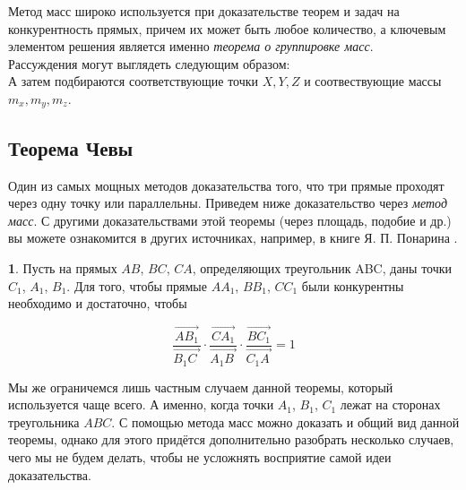 \documentclass[14pt]{extarticle}
\let\Overrightarrow\overrightarrow
\theoremstyle{definition}
\newcommand{\theoremmark} {
\tikz [baseline = (N.base), roundnode/.style={inner sep = 3pt, circle, draw=black!90, 
fill=white, very thick, minimum size=5mm},] {
\node [roundnode] (N){Т}    
    }
}
\theoremstyle{theorem}
\newenvironment{namedtheorem}[2]
{
\newcommand{\foo}{#1}
\newtheorem*{\foo{}}{\normalfont\fontsize{15}{15}{\theoremmark Теорема #2}}
\begin{\foo{}}
}
{\end{\foo{}}}
\begin{document}
Метод масс широко используется при доказательстве теорем и задач на
конкурентность прямых, причем их может быть любое количество, а ключевым 
элементом решения является именно \textit{теорема о группировке масс}.\\
Рассуждения могут выглядеть следующим образом:
\textit{}\\
А затем подбираются соответствующие точки \(X, Y, Z\) и соотвествующие 
массы \(m_x, m_y, m_z\).

\subsection{Теорема Чевы} 

\indent Один из самых мощных методов доказательства того, что три прямые 
проходят через одну точку или параллельны. 
Приведем ниже доказательство через \textit{метод масс}.
С другими доказательствами этой теоремы (через площадь, подобие и др.) 
вы можете ознакомится в других источниках, например, в книге Я. П. Понарина
.\\

\begin{namedtheorem}{ceva}{Чевы}
	Пусть на прямых $AB$, $BC$, $CA$, определяющих
    треугольник ABC, даны точки $C_1$, $A_1$, $B_1$. Для того, чтобы прямые
    $AA_1$, $BB_1$, $CC_1$ были конкурентны
    необходимо и достаточно, чтобы
	
	\begin{ceqn}
	\[
    \dfrac{\Overrightarrow{AB_1}}{\Overrightarrow{B_1C_{\, \,}}} \cdot 
	\dfrac{\Overrightarrow{CA_1}}
	{\Overrightarrow{A_1B_{\:}}} \cdot \dfrac{\Overrightarrow{BC_1}}
	{\Overrightarrow{C_1A_{\,}}} = 1
	\]
    \end{ceqn}

\end{namedtheorem}


Мы же ограничемся лишь частным случаем данной теоремы, который используется 
чаще всего. А именно, когда точки \(A_1\), \(B_1\), \(C_1\) лежат на сторонах 
треугольника \(ABC\). С помощью метода масс можно доказать и общий вид данной 
теоремы, однако для этого придётся дополнительно разобрать несколько случаев, 
чего мы не будем делать, чтобы не усложнять восприятие самой идеи доказательства.\\ 
\end{document}
